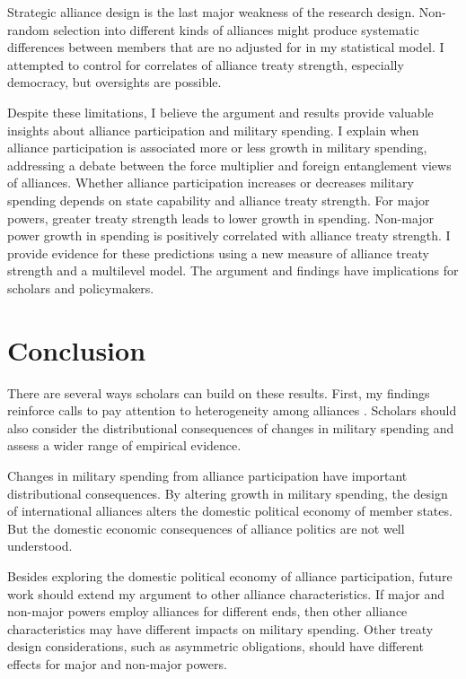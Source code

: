 \documentclass[12pt]{article}
\begin{document}
Strategic alliance design is the last major weakness of the research design. 
Non-random selection into different kinds of alliances might produce systematic differences between members that are no adjusted for in my statistical model. 
I attempted to control for correlates of alliance treaty strength, especially democracy, but oversights are possible. 


Despite these limitations, I believe the argument and results provide valuable insights about alliance participation and military spending. 
I explain when alliance participation is associated more or less growth in military spending, addressing a debate between the force multiplier and foreign entanglement views of alliances. 
Whether alliance participation increases or decreases military spending depends on state capability and alliance treaty strength. 
For major powers, greater treaty strength leads to lower growth in spending. 
Non-major power growth in spending is positively correlated with alliance treaty strength. 
I provide evidence for these predictions using a new measure of alliance treaty strength and a multilevel model. 
The argument and findings have implications for scholars and policymakers. 



\section{Conclusion}


There are several ways scholars can build on these results. 
First, my findings reinforce calls to pay attention to heterogeneity among alliances \citep{Leeds2003, DigiuseppePoast2016}.
Scholars should also consider the distributional consequences of changes in military spending and assess a wider range of empirical evidence. 


Changes in military spending from alliance participation have important distributional consequences. 
By altering growth in military spending, the design of international alliances alters the domestic political economy of member states. 
But the domestic economic consequences of alliance politics are not well understood. 


Besides exploring the domestic political economy of alliance participation, future work should extend my argument to other alliance characteristics. 
If major and non-major powers employ alliances for different ends, then other alliance characteristics may have different impacts on military spending. 
Other treaty design considerations, such as asymmetric obligations, should have different effects for major and non-major powers. 
\end{document}
